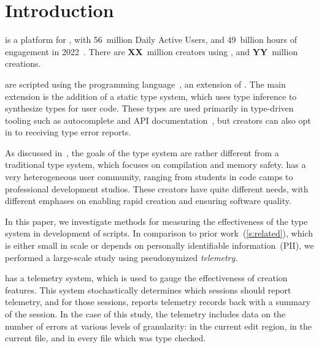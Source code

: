 \documentclass[
  acmsmall,
  review,
]{acmart}
\begin{document}


\maketitle

\section{Introduction}
\label{s:introduction}

 is a platform for ,
with 56~million Daily Active Users, and 49~billion hours of engagement in
2022~.
There are \textbf{XX}~million creators using ,
and \textbf{YY}~million creations.

 are scripted using the 
 programming language~,
an extension of .
The main extension is the addition of a static type system, which uses
type inference to synthesize types for user code. These types
are used primarily in type-driven tooling such as autocomplete
and API documentation~,
but creators can also opt in to receiving type error reports.

As discussed in~,
the goals of the  type system are rather different from
a traditional type system, which focuses on compilation and memory safety.
 has a very heterogeneous user community, ranging from
students in code camps to professional development studios. These
creators have quite different needs, with different emphases on
enabling rapid creation and ensuring software quality.

In this paper, we investigate methods for measuring the effectiveness
of the  type system in development of  scripts.
In comparison to prior work~(\cref{s:related}), which is either small in scale
or depends on personally identifiable information~(PII),
we performed a large-scale study using pseudonymized \emph{telemetry}.

 has a telemetry system, which is used to gauge
the effectiveness of creation features. This system stochastically
determines which sessions should report telemetry, and for those
sessions, reports telemetry records back with a summary of the
session. In the case of this study, the telemetry includes data on the
number of errors at various levels of granularity: in the current edit
region, in the current file, and in every file which was type
checked.
\end{document}
